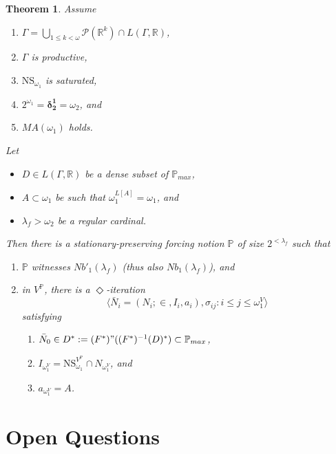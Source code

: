 \documentclass[12pt, twoside]{memoir}
\numberwithin{equation}{section}
\newtheorem{thm}{Theorem}[section]
\theoremstyle{definition}
\theoremstyle{remark}
\theoremstyle{definition}
\theoremstyle{definition}
\theoremstyle{definition}
\theoremstyle{remark}
\begin{document}
\begin{thm}\label{notion3}
Assume
\begin{enumerate}[label=(\roman*), leftmargin=40pt]
    \item $\Gamma  = \bigcup_{1 \leq k < \omega} \mathcal{P}(\mathbb{R}^{k}) \cap L(\Gamma, \mathbb{R})$,
    \item $\Gamma$ is productive,
    \item $\mathrm{NS}_{\omega_1}$ is saturated,
    \item $2^{\omega_1} = \mathbf{\delta^1_2} = \omega_2$, and
    \item $MA(\omega_1)$ holds.
\end{enumerate}
Let 
\begin{itemize}
    \item $D \in L(\Gamma, \mathbb{R})$ be a dense subset of $\mathbb{P}_{max}$,
    \item $A \subset \omega_1$ be such that $\omega_1^{L[A]} = \omega_1$, and
    \item $\lambda_f > \omega_2$ be a regular cardinal.
\end{itemize}
Then there is a stationary-preserving forcing notion $\mathbb{P}$ of size $2^{< \lambda_f}$ such that 
\begin{enumerate}[label=(\alph*)]
    \item $\mathbb{P}$ witnesses $Nb'_1(\lambda_f)$ (thus also $Nb_1(\lambda_f)$), and
    \item in $V^{\mathbb{P}}$, there is a $\Diamond$-iteration $$\langle \bar{N}_i = (N_i; \in, I_i, a_i), \sigma_{ij} : i \leq j \leq \omega_1^V \rangle$$ satisfying 
    \begin{enumerate}[label=(\arabic*), leftmargin=40pt]
        \item $\bar{N}_0 \in D^* := (F^*) " ((F^*)^{-1}(D)^*) \subset \mathbb{P}_{max}$,
        \item $I_{\omega_1^V} = \mathrm{NS}_{\omega_1}^{V^{\mathbb{P}}} \cap N_{\omega_1^V}$, and
        \item $a_{\omega_1^V} = A$.
    \end{enumerate}
\end{enumerate}
\end{thm}

\section{Open Questions}
\end{document}
